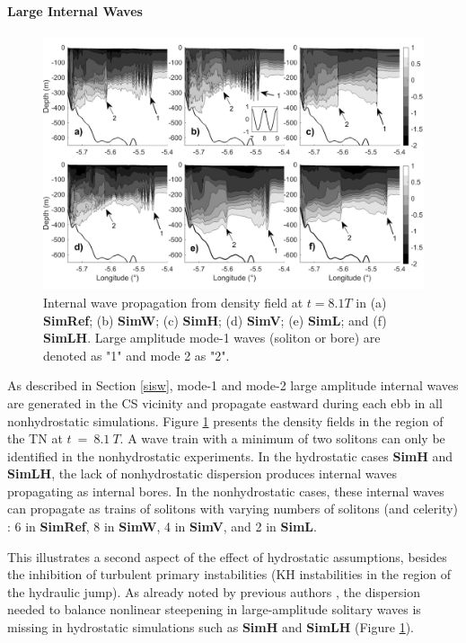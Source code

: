 \paragraph{Large Internal Waves}
\begin{figure}[!h]
  \includegraphics[width=\textwidth]{./GBR2D/figure12.png}
  \caption{Internal wave propagation from density field at $t = 8.1 T$ in (a) \textbf{SimRef}; (b) \textbf{SimW}; (c) \textbf{SimH}; (d) \textbf{SimV}; (e) \textbf{SimL}; and (f) \textbf{SimLH}. Large amplitude mode-1 waves (soliton or bore) are denoted as "1" and mode 2 as "2".}
  \label{fig_trains_num}
\end{figure}

As described in Section \ref{sisw}, mode-1 and mode-2 large amplitude internal waves are generated in the CS vicinity and propagate eastward during each ebb in all nonhydrostatic simulations. Figure \ref{fig_trains_num} presents the density fields in the region of the TN at $t\ =\ 8.1\ T$. A wave train with a minimum of two solitons can only be identified in the nonhydrostatic experiments. In the hydrostatic cases \textbf{SimH} and \textbf{SimLH}, the lack of nonhydrostatic dispersion produces internal waves propagating as internal bores. In the nonhydrostatic cases, these internal waves can propagate as trains of solitons with varying numbers of solitons (and celerity) : 6 in \textbf{SimRef}, 8 in \textbf{SimW}, 4 in \textbf{SimV}, and 2 in \textbf{SimL}. 

This illustrates a second aspect of the effect of hydrostatic assumptions, besides the inhibition of turbulent primary instabilities (KH instabilities in the region of the hydraulic jump). As already noted by previous authors \citep{Sannino2004}, the dispersion needed to balance nonlinear steepening in large-amplitude solitary waves is missing in hydrostatic simulations such as \textbf{SimH} and \textbf{SimLH} (Figure \ref{fig_trains_num}).

